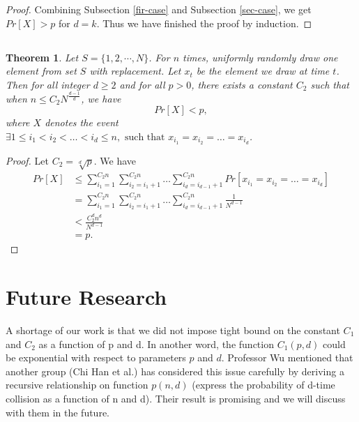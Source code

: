 \documentclass{article}
\newtheorem{theorem}{Theorem}
\begin{document}
\begin{spacing}{1.1}
\begin{proof}
    Combining Subsection \ref{fir-case} and Subsection \ref{sec-case}, we get $Pr[X] > p$ for $d = k$. Thus we have finished the proof by induction.
    \end{proof}


    \subsection{}

    \begin{theorem}

    Let $S = \{1, 2, \cdots, N\}$. For $n$ times, uniformly randomly draw one element from set $S$ with replacement. Let $x_t$ be the element we draw at time $t$. Then for all integer $d\geq 2$ and for all $p > 0$, there exists a constant $C_2$ such that when $n \leq C_2 {N}^{\frac{d-1}{d}}$, we have
    $$Pr[X] < p,$$
    where $X$ denotes the event $\exists 1\leq i_1< i_2<\dots<i_d \leq n, \text{ such that } x_{i_1} = x_{i_2}=\dots=x_{i_d}$.

    \end{theorem}

    \begin{proof}

    Let $C_2=\sqrt[d]{p}$. We have
    \begin{align*}
    Pr[X]
    &\leq \sum_{i_1=1}^{C_2n}\sum_{i_2=i_1+1}^{C_2n}\dots\sum_{i_d=i_{d-1}+1}^{C_2n}Pr[x_{i_1} = x_{i_2}=\dots=x_{i_d}]  \\
    &=\sum_{i_1=1}^{C_2n}\sum_{i_2=i_1+1}^{C_2n}\dots\sum_{i_d=i_{d-1}+1}^{C_2n}\frac{1}{N^{d-1}}  \\
    &<\frac{C_2^dn^d}{N^{d-1}}  \\
    &=p.
    \end{align*}

    \end{proof}

    \section*{Future Research}
    A shortage of our work is that we did not impose tight bound on the constant $C_1$ and $C_2$ as a function of p and d. In another word, the function $C_1(p, d)$ could be exponential with respect to parameters $p$ and $d$. Professor Wu mentioned that another group (Chi Han et al.) has considered this issue carefully by deriving a recursive relationship on function $p(n, d)$ (express the probability of d-time collision as a function of n and d). Their result is promising and we will discuss with them in the future.


\end{spacing}
\end{document}
